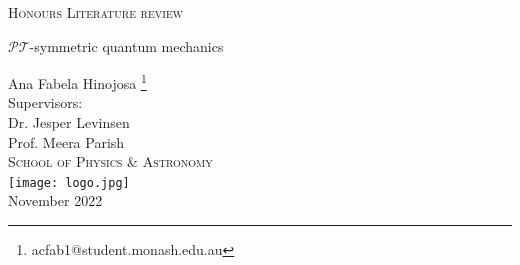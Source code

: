 \documentclass[12pt, a4paper]{report}
\begin{document}
\begin{titlepage}
\begin{center}


\vspace{1cm}
\textsc{Honours Literature review}
\vspace{2.5cm}

{\Huge \( \mathcal{PT} \)-symmetric quantum mechanics}
\vspace{3cm}

{\LARGE Ana Fabela Hinojosa \footnote{acfab1@student.monash.edu.au}} \\
\vspace{0.4cm}
{\Large Supervisors:\\ Dr. Jesper Levinsen \\ Prof. Meera Parish \\}
\textsc{School of Physics \& Astronomy} \\
\vspace{3cm}
\texttt{[image: logo.jpg]} \\ %
\vspace{3cm}
{\LARGE November 2022}\\
\vspace{0.5cm}
\end{center}
\end{titlepage}






\tableofcontents %



\end{document}
